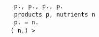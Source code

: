 \begin{figure}[H]
    \texttt{
    \textcolor{white}{F} p., p., p., p. \\
    \textcolor{white}{FF} products p, nutrients n\\
    \textcolor{white}{FF} p. = n. \\ 
    \textcolor{white}{FF}(  n.) > 
    }
\end{figure}
